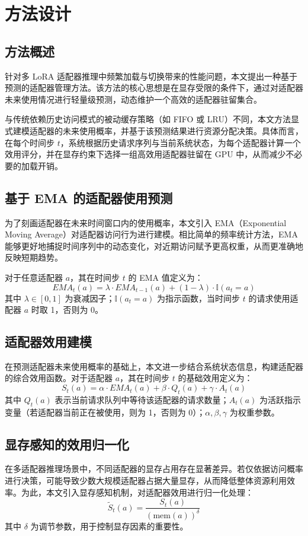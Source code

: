 \section{方法设计}
\subsection{方法概述}
针对多 LoRA 适配器推理中频繁加载与切换带来的性能问题，本文提出一种基于预测的适配器管理方法。该方法的核心思想是在显存受限的条件下，通过对适配器未来使用情况进行轻量级预测，动态维护一个高效的适配器驻留集合。

与传统依赖历史访问模式的被动缓存策略（如 FIFO 或 LRU）不同，本文方法显式建模适配器的未来使用概率，并基于该预测结果进行资源分配决策。具体而言，在每个时间步 $t$，系统根据历史请求序列与当前系统状态，为每个适配器计算一个效用评分，并在显存约束下选择一组高效用适配器驻留在 GPU 中，从而减少不必要的加载开销。

\subsection{基于 EMA 的适配器使用预测}
为了刻画适配器在未来时间窗口内的使用概率，本文引入 EMA（Exponential Moving Average）对适配器访问行为进行建模。相比简单的频率统计方法，EMA 能够更好地捕捉时间序列中的动态变化，对近期访问赋予更高权重，从而更准确地反映短期趋势。

对于任意适配器 $a$，其在时间步 $t$ 的 EMA 值定义为：
\begin{equation}
EMA_t(a)=\lambda\cdot EMA_{t-1}(a)+(1-\lambda)\cdot\mathbb{I}(a_t=a)
\end{equation}
其中 $\lambda\in[0,1]$ 为衰减因子；$\mathbb{I}(a_t=a)$ 为指示函数，当时间步 $t$ 的请求使用适配器 $a$ 时取 1，否则为 0。

\subsection{适配器效用建模}
在预测适配器未来使用概率的基础上，本文进一步结合系统状态信息，构建适配器的综合效用函数。对于适配器 $a$，其在时间步 $t$ 的基础效用定义为：
\begin{equation}
S_t(a)=\alpha\cdot EMA_t(a)+\beta\cdot Q_t(a)+\gamma\cdot A_t(a)
\end{equation}
其中 $Q_t(a)$ 表示当前请求队列中等待该适配器的请求数量；$A_t(a)$ 为活跃指示变量（若适配器当前正在被使用，则为 1，否则为 0）；$\alpha,\beta,\gamma$ 为权重参数。

\subsection{显存感知的效用归一化}
在多适配器推理场景中，不同适配器的显存占用存在显著差异。若仅依据访问概率进行决策，可能导致少数大规模适配器占据大量显存，从而降低整体资源利用效率。为此，本文引入显存感知机制，对适配器效用进行归一化处理：
\begin{equation}
\tilde{S}_t(a)=\frac{S_t(a)}{(\mathrm{mem}(a))^\delta}
\end{equation}
其中 $\delta$ 为调节参数，用于控制显存因素的重要性。

